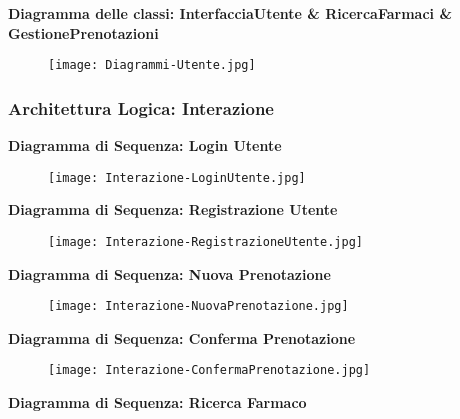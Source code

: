 \newpage
\textbf{Diagramma delle classi: InterfacciaUtente \& RicercaFarmaci \& GestionePrenotazioni }

\begin{figure}[h!]
    \begin{center}
        \texttt{[image: Diagrammi-Utente.jpg]}
    \end{center}
\end{figure}
\hfill \break

\newpage
\subsubsection{Architettura Logica: Interazione}
\hfill \break

\textbf{Diagramma di Sequenza: Login Utente}

\begin{figure}[h!]
    \begin{center}
        \texttt{[image: Interazione-LoginUtente.jpg]}
    \end{center}
\end{figure}
\hfill \break

\textbf{Diagramma di Sequenza: Registrazione Utente}

\begin{figure}[h!]
    \begin{center}
        \texttt{[image: Interazione-RegistrazioneUtente.jpg]}
    \end{center}
\end{figure}
\hfill \break

\textbf{Diagramma di Sequenza: Nuova Prenotazione}

\begin{figure}[h!]
    \begin{center}
        \texttt{[image: Interazione-NuovaPrenotazione.jpg]}
    \end{center}
\end{figure}
\hfill \break

\textbf{Diagramma di Sequenza: Conferma Prenotazione}

\begin{figure}[h!]
    \begin{center}
        \texttt{[image: Interazione-ConfermaPrenotazione.jpg]}
    \end{center}
\end{figure}
\hfill \break

\textbf{Diagramma di Sequenza: Ricerca Farmaco}

